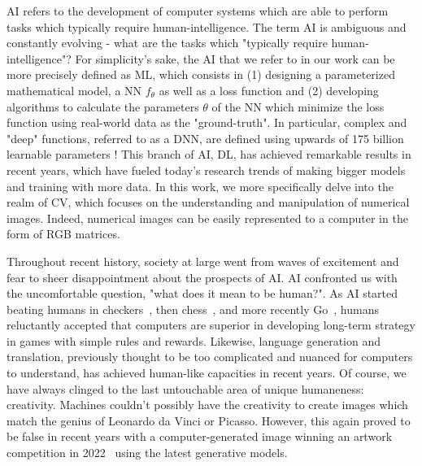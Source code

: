 \ac{AI} refers to the development of computer systems which are able to perform tasks which typically require 
human-intelligence. The term \ac{AI} is ambiguous and constantly evolving - what are the tasks which "typically require human-intelligence"? 
 For simplicity's sake, the \ac{AI} that we refer to in our work can be more precisely defined as 
\ac{ML}, which consists in (1) designing a parameterized mathematical model, a \ac{NN} $f_\theta$ as well as a loss function and 
(2) developing algorithms to calculate the parameters $\theta$ of the \ac{NN} which minimize the loss 
function using real-world data as the "ground-truth". In particular, complex and "deep" functions, referred to as a
\ac{DNN}, are defined using upwards of 175 billion learnable parameters \citep{gpt3}! This branch of \ac{AI}, \ac{DL}, 
has achieved remarkable results in recent years, which have fueled today's research trends of making bigger models and training 
with more data. In this work, we more specifically delve into the realm of \ac{CV}, which focuses on the understanding and manipulation of 
numerical images. Indeed, numerical images can be easily
represented to a computer in the form of RGB matrices.


Throughout recent history, society at large went from waves of excitement and fear to sheer disappointment about the prospects 
of \ac{AI}. \ac{AI} confronted us with the uncomfortable question, "what does it mean to be human?". As \ac{AI} started beating 
humans in checkers~\citep{checkers_is_solved}, then chess~\citep{CAMPBELL200257}, and more recently Go~\citep{silver2017mastering}, 
humans reluctantly accepted that computers are 
superior in developing long-term strategy in games with simple rules and rewards. Likewise, language generation and translation, previously 
thought to be too complicated and nuanced for computers to understand, has achieved human-like capacities in recent years. Of course,
we have always clinged to the last untouchable area of unique humaneness: creativity. Machines couldn't possibly have the creativity to 
create images which match 
the genius of Leonardo da Vinci or Picasso. However, this again proved to be false in recent years with a computer-generated image winning an artwork
competition in 2022~\citep{artcomp} using the latest generative models. 

